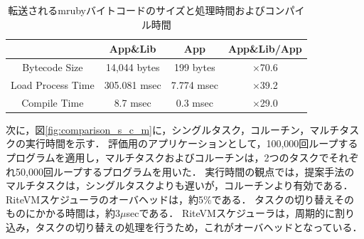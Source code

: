 \documentclass[submit,techrep]{ipsj}
\begin{document}

\begin{table}[t]
    \centering
    \caption{転送されるmrubyバイトコードのサイズと処理時間およびコンパイル時間}
    {\tabcolsep=0.1cm
    \begin{tabular}{c||c|c|c}
                            & App\&Lib     & App        &   App\&Lib/App  \\ \hline
          Bytecode Size     & 14,044 bytes & 199 bytes  &   $\times$70.6          \\ %
          Load Process Time & 305.081 msec & 7.774 msec &   $\times$39.2          \\
          Compile Time      & 8.7 msec     & 0.3 msec   &   $\times$29.0          \\
    \end{tabular}
    }
    \vspace{-3mm}
    \label{tab:size_and_time}
\end{table}

次に，図\ref{fig:comparison_s_c_m}に，シングルタスク，コルーチン，マルチタスクの実行時間を示す．
評価用のアプリケーションとして，100,000回ループするプログラムを適用し，マルチタスクおよびコルーチンは，2つのタスクでそれぞれ50,000回ループするプログラムを用いた．
実行時間の観点では，提案手法のマルチタスクは，シングルタスクよりも遅いが，コルーチンより有効である．
RiteVMスケジューラのオーバヘッドは，約5\%である．
タスクの切り替えそのものにかかる時間は，約3$\mu$secである．
RiteVMスケジューラは，周期的に割り込み，タスクの切り替えの処理を行うため，これがオーバヘッドとなっている．
\end{document}
